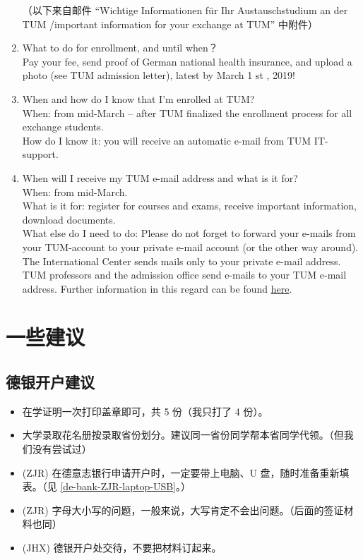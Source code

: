 \documentclass[oneside,final]{book}
\begin{document}
\begin{enumerate}
  （以下来自邮件 ``Wichtige Informationen für Ihr Austauschstudium an der TUM /important information for your exchange at TUM'' 中附件）
  \item What to do for enrollment, and until when？ \\
  Pay your fee, send proof of German national health insurance, and upload a photo
  (see TUM admission letter), latest by March 1 st , 2019!
  \item When and how do I know that I’m enrolled at TUM? \\
  When: from mid-March – after TUM finalized the enrollment process for all exchange students. \\
  How do I know it: you will receive an automatic e-mail from TUM IT-support.
  \item When will I receive my TUM e-mail address and what is it for? \\
  When: from mid-March. \\
  What is it for: register for courses and exams, receive important information, download documents. \\
  What else do I need to do: Please do not forget to forward your e-mails from your TUM-account to your
  private e-mail account (or the other way around). The International Center sends mails only to your private
  e-mail address. TUM professors and the admission office send e-mails to your TUM e-mail address. Further
  information in this regard can be found \href{http://www.it.tum.de/en/faq/it-services/e-mail/}{here}.
\end{enumerate}

\chapter{一些建议}
\section{德银开户建议}
\begin{itemize}
  \item 在学证明一次打印盖章即可，共 5 份（我只打了 4 份）。
  \item 大学录取花名册按录取省份划分。建议同一省份同学帮本省同学代领。（但我们没有尝试过）
  \item (ZJR) 在德意志银行申请开户时，一定要带上电脑、U 盘，随时准备重新填表。（见 \ref{de-bank-ZJR-laptop-USB}。）
  \item (ZJR) 字母大小写的问题，一般来说，大写肯定不会出问题。（后面的签证材料也同）
  \item (JHX) 德银开户处交待，不要把材料订起来。
\end{itemize}
\end{document}

